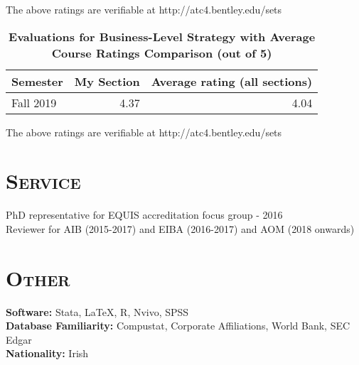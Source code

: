\documentclass[margin, 12pt]{res}
\begin{document}
\begin{resume}
\begin{table}[htbp]
  The above ratings are verifiable at http://atc4.bentley.edu/sets    
  \label{tab:addlabel}%
\end{table}%
 
 

\begin{table}[htbp]
  \centering
  \caption{\textbf{Evaluations for Business-Level Strategy	with Average Course Ratings Comparison (out of 5)}}
    \begin{tabular}{lrr}
    \midrule
    Semester & My Section & Average rating (all sections) \\
    \midrule
    Fall 2019 & 4.37  & 4.04 \\

    \bottomrule


    \end{tabular}%
    
  The above ratings are verifiable at http://atc4.bentley.edu/sets    
  \label{tab:addlabel}%
\end{table}%
 


 
 
 
 \section{\normalfont\textsc{Service}}
PhD representative for EQUIS accreditation focus group - 2016 \\
Reviewer for AIB (2015-2017) and EIBA (2016-2017) and AOM (2018 onwards)




 
\section{\normalfont\textsc{Other}}
\textbf{Software:} Stata, \LaTeX, R, Nvivo, SPSS \\
\textbf{Database Familiarity:} Compustat, Corporate Affiliations, World Bank, SEC Edgar   \\
\textbf{Nationality:} Irish  \\

\end{resume}
\end{document}

